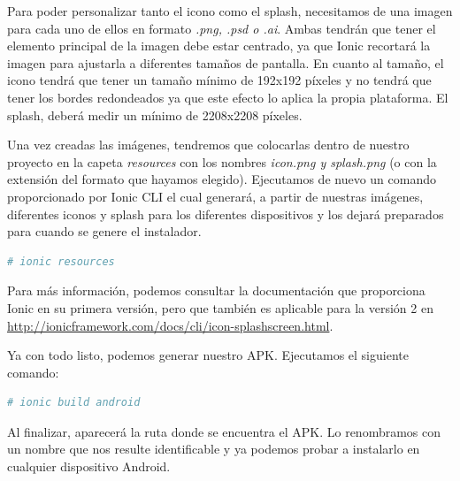 Para poder personalizar tanto el icono como el splash, necesitamos de una imagen para cada uno de ellos en formato \emph{.png, .psd o .ai}. Ambas tendrán que tener el elemento principal de la imagen debe estar centrado, ya que Ionic recortará la imagen para ajustarla a diferentes tamaños de pantalla. En cuanto al tamaño, el icono tendrá que tener un tamaño mínimo de 192x192 píxeles y no tendrá que tener los bordes redondeados ya que este efecto lo aplica la propia plataforma. El splash, deberá medir un mínimo de 2208x2208 píxeles.

Una vez creadas las imágenes, tendremos que colocarlas dentro de nuestro proyecto en la capeta \emph{resources} con los nombres \emph{icon.png y splash.png} (o con la extensión del formato que hayamos elegido). Ejecutamos de nuevo un comando proporcionado por Ionic CLI el cual generará, a partir de nuestras imágenes, diferentes iconos y splash para los diferentes dispositivos y los dejará preparados para cuando se genere el instalador.

\begin{lstlisting}[language=bash]
  # ionic resources
\end{lstlisting}


Para más información, podemos consultar la documentación que proporciona Ionic en su primera versión, pero que también es aplicable para la versión 2 en  \url{http://ionicframework.com/docs/cli/icon-splashscreen.html}.

Ya con todo listo, podemos generar nuestro APK. Ejecutamos el siguiente comando:

\begin{lstlisting}[language=bash]
  # ionic build android
\end{lstlisting}

Al finalizar, aparecerá la ruta donde se encuentra el APK. Lo renombramos con un nombre que nos resulte identificable y ya podemos probar a instalarlo en cualquier dispositivo Android.

